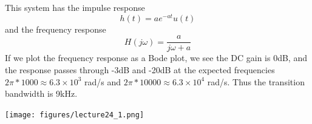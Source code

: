 \begin{example}
\begin{center}
  \end{center}
  
  This system has the impulse response
  \[
  h(t) = ae^{-at}u(t)
  \]
  and the frequency response
  \[
  H(j\omega) = \frac{a}{j\omega + a}
  \]
  If we plot the frequency response as a Bode plot, we see the DC gain is 0dB, and the response passes through -3dB and -20dB at the expected frequencies $2\pi*1000 \approx 6.3\times 10^3$ rad/s and $2\pi*10000 \approx 6.3\times 10^4$ rad/s. Thus the transition bandwidth is 9kHz. 
  \begin{center}
\texttt{[image: figures/lecture24\_1.png]}
  \end{center}
  
\end{example}

